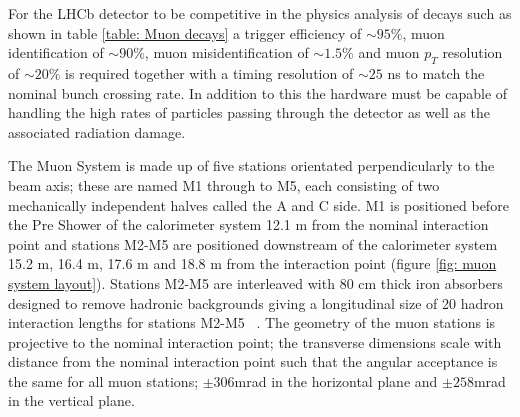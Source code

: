 For the LHCb detector to be competitive in the physics analysis of decays such as shown in table \ref{table: Muon decays} a trigger efficiency of $\sim95\%$, muon identification of $\sim90\%$, muon misidentification of $\sim1.5\%$ and muon $p_T$ resolution of $\sim20\%$ is required 
together with a timing resolution of $\sim25$ ns to match the nominal bunch crossing rate. In addition to this the hardware must be capable of handling the high rates of particles passing through the detector as well as the associated radiation damage.


The Muon System is made up of five stations orientated perpendicularly to the beam axis; these are named M1 through to M5, each consisting of two mechanically independent halves called the A and C side. M1 is positioned before the Pre Shower of the calorimeter system 12.1 m from the nominal interaction point and stations M2-M5 are positioned downstream of the calorimeter system 15.2 m, 16.4 m, 17.6 m and 18.8 m from the interaction point (figure \ref{fig: muon system layout}). Stations M2-M5 are interleaved with 80 cm thick iron absorbers designed to remove hadronic backgrounds giving a longitudinal size of 20 hadron interaction lengths for stations M2-M5 ~\cite{1748-0221-8-02-P02022}. The geometry of the muon stations is projective to the nominal interaction point; the transverse dimensions scale with distance from the nominal interaction point such that the angular acceptance is the same for all muon stations; $\pm 306$mrad in the horizontal plane and $\pm 258$mrad in the vertical plane. 

